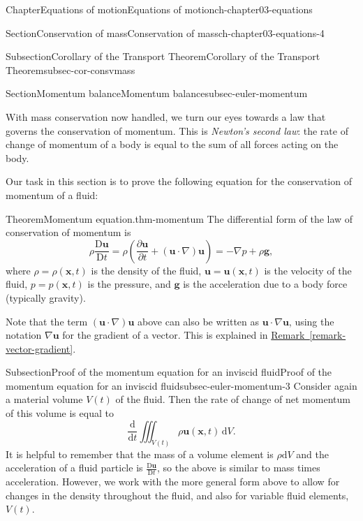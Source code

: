 \documentclass[oneside,10pt,]{book}
\newcommand{\xreffont}{\relax}
\numberwithin{equation}{section}
\newcommand{\de}{\mathrm{d}}
\newcommand{\dd}[2]{\frac{\de#1}{\de#2}}
\newcommand{\DD}[2]{\frac{\mathrm{D}#1}{\mathrm{D}#2}}
\newcommand{\pd}[2]{\frac{\partial#1}{\partial#2}}
\newcommand{\bx}{\boldsymbol{x}}
\newcommand{\bu}{\boldsymbol{u}}
\newcommand{\bg}{\boldsymbol{g}}
\begin{document}
\begin{chapterptx}{Chapter}{Equations of motion}{}{Equations of motion}{}{}{ch-chapter03-equations}
\begin{sectionptx}{Section}{Conservation of mass}{}{Conservation of mass}{}{}{ch-chapter03-equations-4}
\begin{subsectionptx}{Subsection}{Corollary of the Transport Theorem}{}{Corollary of the Transport Theorem}{}{}{subsec-cor-consvmass}
\end{subsectionptx}
\end{sectionptx}
%
%
\typeout{************************************************}
\typeout{************************************************}
%
\begin{sectionptx}{Section}{Momentum balance}{}{Momentum balance}{}{}{subsec-euler-momentum}
\begin{introduction}{}%
With mass conservation now handled, we turn our eyes towards a law that governs the conservation of momentum. This is \emph{Newton's second law}: the rate of change of momentum of a body is equal to the sum of all forces acting on the body.%
\par
Our task in this section is to prove the following equation for the conservation of momentum of a fluid:%
\begin{theorem}{Theorem}{Momentum equation.}{}{thm-momentum}%
The differential form of the law of conservation of momentum is%
\begin{equation}
\rho \DD{\bu}{t} = \rho \left(\pd{\bu}{t} + (\bu \cdot \nabla)\bu\right) = - \nabla p +
\rho \bg,\label{eqn-consvmoment}
\end{equation}
where \(\rho = \rho(\bx,t)\) is the density of the fluid, \(\bu = \bu(\bx, t)\) is the velocity of the fluid, \(p = p(\bx, t)\) is the pressure, and \(\bg\) is the acceleration due to a body force (typically gravity).%
\end{theorem}
Note that the term \((\bu \cdot \nabla)\bu\) above can also be written as \(\bu
\cdot \nabla\bu\), using the notation \(\nabla \bu\) for the gradient of a vector. This is explained in \hyperref[remark-vector-gradient]{Remark~{\xreffont\ref{remark-vector-gradient}}}.%
\end{introduction}%
%
%
\typeout{************************************************}
\typeout{************************************************}
%
\begin{subsectionptx}{Subsection}{Proof of the momentum equation for an inviscid fluid}{}{Proof of the momentum equation for an inviscid fluid}{}{}{subsec-euler-momentum-3}
Consider again a material volume \(V(t)\) of the fluid. Then the rate of change of net momentum of this volume is equal to%
\begin{equation}
\dd{}{t} \iiint_{V(t)} \rho \bu(\bx, t) \, \de{V}.\label{eqn-momentum1}
\end{equation}
It is helpful to remember that the mass of a volume element is \(\rho \de{V}\) and the acceleration of a fluid particle is \(\DD{\bu}{t}\), so the above is similar to mass times acceleration. However, we work with the more general form above to allow for changes in the density throughout the fluid, and also for variable fluid elements, \(V(t)\).%

\end{subsectionptx}
\end{sectionptx}
\end{chapterptx}
\end{document}
